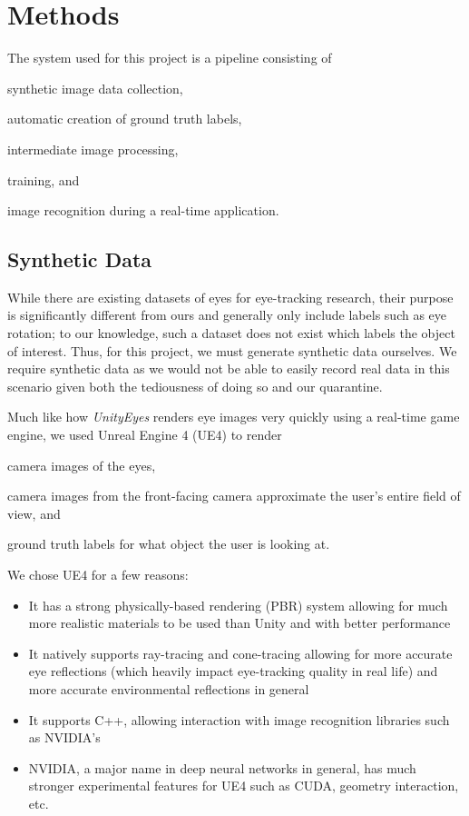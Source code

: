 \section{Methods}

The system used for this project is a pipeline consisting of
\begin{inlist}
\item synthetic image data collection,
\item automatic creation of ground truth labels,
\item intermediate image processing,
\item training, and
\item image recognition during a real-time application.
\end{inlist}

\subsection{Synthetic Data}

While there are existing datasets of eyes for eye-tracking research, their
purpose is significantly different from ours and generally only include labels
such as eye rotation; to our knowledge, such a dataset does not exist which
labels the object of interest. Thus, for this project, we must generate
synthetic data ourselves. We require synthetic data as we would not be able to
easily record real data in this scenario given both the tediousness of doing so
and our quarantine.

Much like how \emph{UnityEyes} renders eye images very quickly using a
real-time game engine, we used Unreal Engine 4 (UE4) to render
\begin{inlist}
\item camera images of the eyes,
\item
    camera images from the front-facing camera approximate the user's entire
    field of view, and
\item ground truth labels for what object the user is looking at.
\end{inlist}
We chose UE4 for a few reasons:

\begin{itemize}[leftmargin=*,noitemsep]
    \item
        It has a strong physically-based rendering (PBR) system allowing for
        much more realistic materials to be used than Unity and with better
        performance
    \item
        It natively supports ray-tracing and cone-tracing allowing for more
        accurate eye reflections (which heavily impact eye-tracking quality in
        real life) and more accurate environmental reflections in general
    \item
        It supports C++, allowing interaction with image recognition libraries
        such as NVIDIA's
    \item
        NVIDIA, a major name in deep neural networks in general, has much
        stronger experimental features for UE4 such as CUDA, geometry
        interaction, etc.
\end{itemize}

